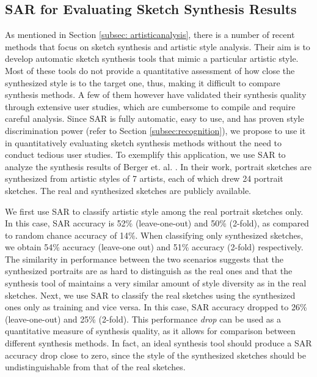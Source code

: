 
\vspace{-2mm}
\subsection{SAR for Evaluating Sketch Synthesis Results}
\vspace{-2mm}
As mentioned in Section \ref{subsec: artisticanalysis}, there is a number of recent methods that focus on sketch synthesis and artistic style analysis. Their aim is to develop automatic sketch synthesis tools that mimic a particular artistic style. Most of these tools do not provide a quantitative assessment of how close the synthesized style is to the target one, thus, making it difficult to compare synthesis methods. A few of them however have validated their synthesis quality through extensive user studies, which are cumbersome to compile and require careful analysis. Since SAR is fully automatic, easy to use, and has proven style discrimination power (refer to Section \ref{subsec:recognition}), we propose to use it in quantitatively evaluating sketch synthesis methods without the need to conduct tedious user studies. To exemplify this application, we use SAR to analyze the synthesis results of Berger et. al. . In their work, portrait sketches are synthesized from artistic styles of 7 artists, each of which drew 24 portrait sketches. The real and synthesized sketches are publicly available.




We first use SAR to classify artistic style among the real portrait sketches only. In this case, SAR accuracy is 52\% (leave-one-out) and 50\% (2-fold), as compared to random chance accuracy of 14\%. When classifying only synthesized sketches, we obtain 54\% accuracy (leave-one out) and 51\% accuracy (2-fold) respectively. The  similarity in performance between the two scenarios suggests that the synthesized portraits are as hard to distinguish as the real ones and that the synthesis tool of \cite{Berger:2013:SAP:2461912.2461964} maintains a very similar amount of style diversity as in the real sketches. Next, we use SAR to classify the real sketches using the synthesized ones only as training and vice versa. In this case, SAR accuracy dropped to 26\% (leave-one-out) and 25\% (2-fold). This performance \emph{drop} can be used as a quantitative measure of synthesis quality, as it allows for comparison between different synthesis methods. In fact, an ideal synthesis tool should produce a SAR accuracy drop close to zero, since the style of the synthesized sketches should be undistinguishable from that of the real sketches.

